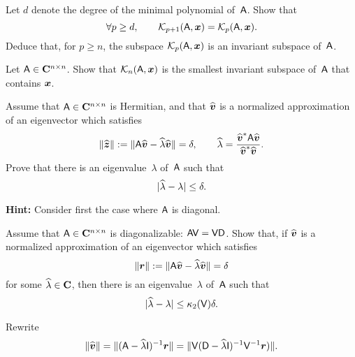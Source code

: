 \begin{exercise}
    Let $d$ denote the degree of the minimal polynomial of~$\mathsf A$.
    Show that
    \[
        \forall p \geq d, \qquad
        \mathcal K_{p+1}(\mathsf A, \mathbf{\boldsymbol{x}}) =
        \mathcal K_{p}(\mathsf A, \mathbf{\boldsymbol{x}}).
    \]
    Deduce that, for $p \geq n$,
    the subspace $\mathcal K_{p}(\mathsf A, \mathbf{\boldsymbol{x}})$ is an invariant subspace of~$\mathsf A$.
\end{exercise}

\begin{exercise}
    Let $\mathsf A \in \mathbf C^{n \times n}$.
    Show that $\mathcal K_{n}(\mathsf A, \mathbf{\boldsymbol{x}})$ is the smallest invariant subspace of~$\mathsf A$ that contains $\mathbf{\boldsymbol{x}}$.
\end{exercise}

\begin{exercise}
    \label{exercise:a_posteriori_1}
    Assume that $\mathsf A \in \mathbf C^{n \times n}$ is Hermitian,
    and that $\widehat {\mathbf{\boldsymbol{v}}}$ is a normalized approximation of an eigenvector which satisfies
    \[
        \lVert\widehat {\mathbf{\boldsymbol{z}}}\rVert :=  \lVert\mathsf A \widehat {\mathbf{\boldsymbol{v}}} - \widehat \lambda \widehat {\mathbf{\boldsymbol{v}}}\rVert = \delta,
        \qquad \widehat \lambda = \frac{\widehat {\mathbf{\boldsymbol{v}}}^* \mathsf A \widehat {\mathbf{\boldsymbol{v}}}}{\widehat {\mathbf{\boldsymbol{v}}}^* \widehat {\mathbf{\boldsymbol{v}}}}.
    \]
    Prove that there is an eigenvalue~$\lambda$ of~$\mathsf A$ such that
    \[
        \lvert\widehat \lambda - \lambda\rvert \leq \delta.
    \]

    \noindent \textbf{Hint:} Consider first the case where $\mathsf A$ is diagonal.
\end{exercise}

\begin{exercise}
    \label{exercise:a_posteriori_2}
    Assume that $\mathsf A \in \mathbf C^{n \times n}$ is diagonalizable: $\mathsf A \mathsf V = \mathsf V \mathsf D$.
    Show that, if $\widehat {\mathbf{\boldsymbol{v}}}$ is a normalized approximation of an eigenvector which satisfies
    \[
        \lVert\mathbf{\boldsymbol{r}}\rVert :=  \lVert\mathsf A \widehat {\mathbf{\boldsymbol{v}}} - \widehat \lambda \widehat {\mathbf{\boldsymbol{v}}}\rVert = \delta
    \]
    for some $\widehat \lambda \in \mathbf C$,
    then there is an eigenvalue~$\lambda$ of~$\mathsf A$ such that
    \[
        \lvert\widehat \lambda - \lambda\rvert \leq \kappa_2(\mathsf V) \delta.
    \]

    Rewrite
    \[
        \lVert\widehat {\mathbf{\boldsymbol{v}}}\rVert = \lVert(\mathsf A - \widehat \lambda \mathsf I)^{-1}  {\mathbf{\boldsymbol{r}}}\rVert
        = \lVert\mathsf V (\mathsf D - \widehat \lambda \mathsf I)^{-1}  \mathsf V^{-1} {\mathbf{\boldsymbol{r}}})\rVert.
    \]
\end{exercise}

